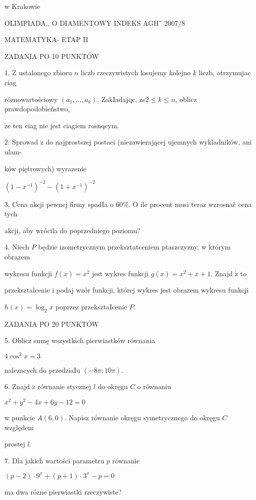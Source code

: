\documentclass[a4paper,12pt]{article}
\begin{document}
w Krakowie

OLIMPIADA,, O DIAMENTOWY INDEKS AGH'' 2007/8

MATEMATYKA- ETAP II

ZADANIA PO 10 PUNKTÓW

1. $\mathrm{Z}$ ustalonego zbioru $n$ liczb rzeczywistych losujemy kolejno $k$ liczb, otrzymujac ciag

róznowartościowy $(a_{1},\ldots,a_{k})$. ZakIadajqc, $\dot{\mathrm{z}}\mathrm{e}2\leq k\leq n$, oblicz prawdopodobieństwo,

$\dot{\mathrm{z}}\mathrm{e}$ ten ciag nie jest ciagiem rosnqcym.

2. Sprowad $\acute{\mathrm{z}}$ do najprostszej postaci (niezawierającej ujemnych wykladników, ani ulam-

ków piętrowych) wyrazenie

$(1-x^{-1})^{-2}-(1+x^{-1})^{-2}$

3. Cena akcji pewnej firmy spadIa o 60\%. $\mathrm{O}$ ile procent musi teraz wzrosnač cena tych

akcji, aby wrócila do poprzedniego poziomu?

4. Niech $P$ będzie izometrycznym przeksztatceniem ptaszczyzny, w którym obrazem

wykresu funkcji $f(x) = x^{2}$ jest wykres funkcji $g(x) = x^{2}+x+1.$ Znajd $\acute{\mathrm{z}}$ to

przeksztalcenie i podaj wzór funkcji, której wykres jest obrazem wykresu funkcji

$h(x)=\log_{2}x$ poprzez przeksztaIcenie $P.$

ZADANIA PO 20 PUNKTÓW

5. Oblicz sumę wszystkich pierwiastków równania

$4\cos^{2}x=3$

nalezacych do przedziaIu $(-8\pi;10\pi).$

6. Znajd $\acute{\mathrm{z}}$ równanie stycznej $l$ do okręgu $C$ o równaniu

$x^{2}+y^{2}-4x+6y-12=0$

w punkcie $A(6,0)$. Napisz równanie okręgu symetrycznego do okręgu $C$ względem

prostej $l.$

7. Dla jakich wartości parametru $p$ równanie

$(p-2)\cdot 9^{x}+(p+1)\cdot 3^{x}-p=0$

ma dwa rózne pierwiastki rzeczywiste?
\end{document}
